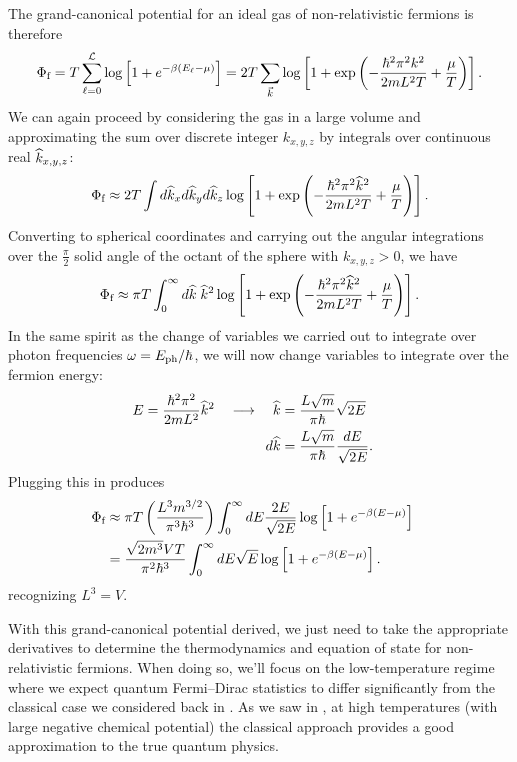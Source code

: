 The grand-canonical potential for an ideal gas of non-relativistic fermions is therefore
\begin{equation*}
  \Phi_{\text{f}} = T \sum_{\ell = 0}^{\mathcal L} \log\left[1 + e^{-\beta (E_{\ell} - \mu)}\right] = 2T \sum_{\vec k} \log\left[1 + \exp\left(-\frac{\hbar^2 \pi^2 k^2}{2mL^2 T} + \frac{\mu}{T}\right)\right].
\end{equation*}
We can again proceed by considering the gas in a large volume and approximating the sum over discrete integer $k_{x, y, z}$ by integrals over continuous real $\widehat k_{x, y, z}$:
\begin{equation*}
  \Phi_{\text{f}} \approx 2T \int d\widehat k_x d\widehat k_y d\widehat k_z \log\left[1 + \exp\left(-\frac{\hbar^2 \pi^2 \widehat k^2}{2mL^2 T} + \frac{\mu}{T}\right)\right].
\end{equation*}
Converting to spherical coordinates and carrying out the angular integrations over the $\frac{\pi}{2}$ solid angle of the octant of the sphere with $k_{x, y, z} > 0$, we have
\begin{equation*}
  \Phi_{\text{f}} \approx \pi T \int_0^{\infty} d\widehat k \; \widehat k^2 \log\left[1 + \exp\left(-\frac{\hbar^2 \pi^2 \widehat k^2}{2mL^2 T} + \frac{\mu}{T}\right)\right].
\end{equation*}
In the same spirit as the change of variables we carried out to integrate over photon frequencies $\omega = E_{\text{ph}} / \hbar$, we will now change variables to integrate over the fermion energy:
\begin{align*}
  E = \frac{\hbar^2 \pi^2}{2mL^2}\widehat k^2 \quad \longrightarrow \quad \widehat k & = \frac{L\sqrt{m}}{\pi \hbar} \sqrt{2E} \cr
                                                         d\widehat k & = \frac{L\sqrt{m}}{\pi \hbar} \frac{dE}{\sqrt{2E}}.
\end{align*}
Plugging this in produces
\begin{align}
  \Phi_{\text{f}} & \approx \pi T \left(\frac{L^3 m^{3 / 2}}{\pi^3 \hbar^3}\right) \int_0^{\infty} dE \frac{2E}{\sqrt{2E}} \log\left[1 + e^{-\beta(E - \mu)}\right] \cr
                  & = \frac{\sqrt{2 m^3} VT}{\pi^2 \hbar^3} \int_0^{\infty} dE \sqrt{E} \log\left[1 + e^{-\beta(E - \mu)}\right]. \label{eq:fermi_grand}
\end{align}
recognizing $L^3 = V$.

With this grand-canonical potential derived, we just need to take the appropriate derivatives to determine the thermodynamics and equation of state for non-relativistic fermions.
When doing so, we'll focus on the low-temperature regime where we expect quantum Fermi--Dirac statistics to differ significantly from the classical case we considered back in .
As we saw in , at high temperatures (with large negative chemical potential) the classical approach provides a good approximation to the true quantum physics.



